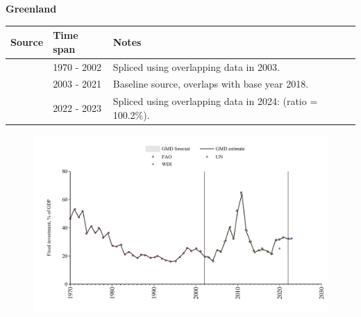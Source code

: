 \documentclass[12pt,a4paper,landscape]{article}
\begin{document}
\begin{adjustbox}{max totalsize={\paperwidth}{\paperheight},center}
\begin{minipage}[t][\textheight][t]{\textwidth}
\vspace*{0.5cm}
{}
\begin{center}
{\Large\bfseries Greenland}
\end{center}
\vspace{0.5cm}
\begin{table}[H]
\centering
\small
\begin{tabular}{|l|l|l|}
\hline
\textbf{Source} & \textbf{Time span} & \textbf{Notes} \\
\hline
\rowcolor{white}\cite{UN}& 1970 - 2002 &Spliced using overlapping data in 2003.\\
\rowcolor{lightgray}\cite{WDI}& 2003 - 2021 &Baseline source, overlaps with base year 2018.\\
\rowcolor{white}\cite{FAO}& 2022 - 2023 &Spliced using overlapping data in 2024: (ratio = 100.2\%).\\
\hline
\end{tabular}
\end{table}
\begin{figure}[H]
\centering
\includegraphics[width=\textwidth,height=0.6\textheight,keepaspectratio]{graphs/GRL_finv_GDP.pdf}
\end{figure}
\end{minipage}
\end{adjustbox}
\end{document}
